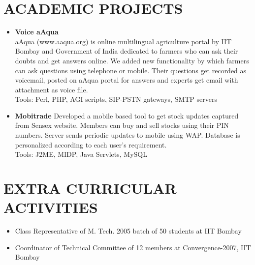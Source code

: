 \documentclass{res}
\begin{document}
\begin{resume}
\begin{itemize}
					  \end{itemize}


					  \section{ACADEMIC PROJECTS}

					  \begin{itemize}
					  \item {\bf Voice aAqua}\\
						aAqua (www.aaqua.org) is online multilingual agriculture portal by IIT Bombay and Government of India dedicated to farmers who can ask their doubts and get answers online. We added new functionality by which farmers can ask questions using telephone or mobile. Their questions get recorded as voicemail, posted on aAqua portal for answers and experts get email with attachment as voice file.\\
	Tools: Perl, PHP, AGI scripts, SIP-PSTN gateways, SMTP servers

					  \item {\bf Mobitrade}
					  Developed a mobile based tool to get stock updates captured from Sensex website. Members can buy and sell stocks using their PIN numbers. Server sends periodic updates to mobile using WAP. Database is personalized according to each user’s requirement.\\
					  Tools: J2ME, MIDP, Java Servlets, MySQL
					  \end{itemize}
\section{EXTRA CURRICULAR ACTIVITIES}
\begin{itemize}
\item Class Representative of M. Tech. 2005 batch of 50 students at IIT Bombay
\item Coordinator of Technical Committee of 12 members at Convergence-2007, IIT Bombay
\end{itemize}

					  \end{resume}
					  
\end{document}
